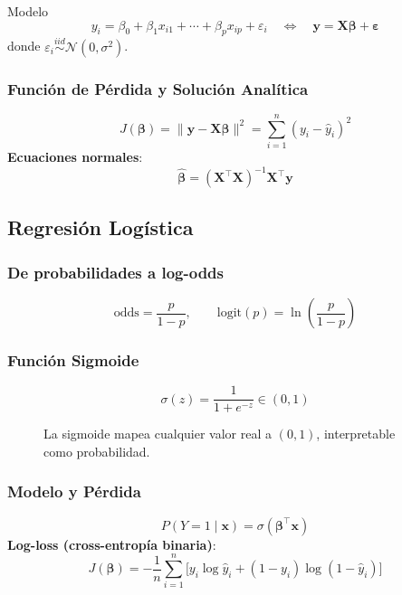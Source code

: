 \documentclass[12pt, a4paper]{article}
\begin{document}
\begin{defbox}{Modelo}
	\[
		y_i = \beta_0 + \beta_1 x_{i1} + \cdots + \beta_p x_{ip} + \varepsilon_i
		\quad\Longleftrightarrow\quad \mathbf{y} = \mathbf{X}\bm{\beta} + \bm{\varepsilon}
	\]
	donde $\varepsilon_i \overset{iid}{\sim} \mathcal{N}(0,\sigma^2)$.
\end{defbox}

\subsubsection{Función de Pérdida y Solución Analítica}
\[
	J(\bm{\beta}) = \|\mathbf{y} - \mathbf{X}\bm{\beta}\|^2
	= \sum_{i=1}^{n}(y_i - \hat{y}_i)^2
\]
\textbf{Ecuaciones normales}:
\[
	\boxed{\hat{\bm{\beta}} = (\mathbf{X}^\top \mathbf{X})^{-1}\mathbf{X}^\top\mathbf{y}}
\]

\subsection{Regresión Logística}

\subsubsection{De probabilidades a log-odds}
\[
	\text{odds} = \frac{p}{1-p}, \qquad
	\text{logit}(p) = \ln\!\left(\frac{p}{1-p}\right)
\]

\subsubsection{Función Sigmoide}
\[
	\sigma(z) = \frac{1}{1+e^{-z}} \in (0,1)
\]

\begin{figure}[H]
	\centering
	\caption{La sigmoide mapea cualquier valor real a $(0,1)$, interpretable como probabilidad.}
\end{figure}

\subsubsection{Modelo y Pérdida}
\[
	P(Y=1\mid\mathbf{x}) = \sigma(\bm{\beta}^\top\mathbf{x})
\]
\textbf{Log-loss (cross-entropía binaria)}:
\[
	J(\bm{\beta}) = -\frac{1}{n}\sum_{i=1}^{n}
	\bigl[y_i\log\hat{y}_i + (1-y_i)\log(1-\hat{y}_i)\bigr]
\]
\end{document}
